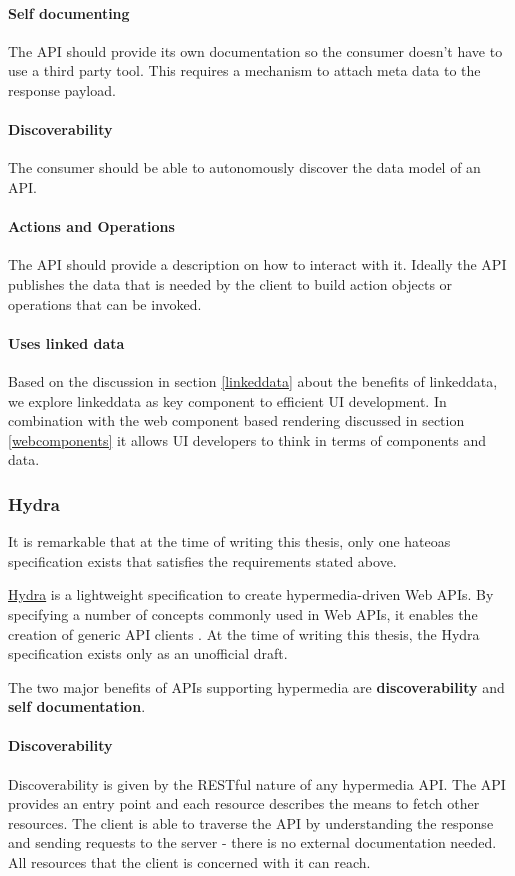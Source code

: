 \paragraph{Self documenting}
The API should provide its own documentation so the consumer doesn't have to use a third party tool. This requires a mechanism to attach meta data to the response payload.

\paragraph{Discoverability}
The consumer should be able to autonomously discover the data model of an API.

\paragraph{Actions and Operations}
The API should provide a description on how to interact with it. Ideally the API publishes the data that is needed by the client to build action objects or operations that can be invoked.

\paragraph{Uses linked data}
Based on the discussion in section \ref{linkeddata} about the benefits of \gls{linkeddata}, we explore \gls{linkeddata} as key component to efficient UI development. In combination with the web component based rendering discussed in section \ref{webcomponents} it allows UI developers to think in terms of components and data.

\subsubsection{Hydra}
It is remarkable that at the time of writing this thesis, only one \gls{hateoas} specification exists that satisfies the requirements stated above.

\href{http://www.hydra-cg.com/}{Hydra} is a lightweight specification to create hypermedia-driven Web APIs. By specifying a number of concepts commonly used in Web APIs, it enables the creation of generic API clients \citep{hydraspecs}. At the time of writing this thesis, the Hydra specification exists only as an unofficial draft.

The two major benefits of APIs supporting hypermedia are \textbf{discoverability} and \textbf{self documentation}.

\paragraph{Discoverability} Discoverability is given by the RESTful nature of any hypermedia API. The API provides an entry point and each resource describes the means to fetch other resources. The client is able to traverse the API by understanding the response and sending requests to the server - there is no external documentation needed. All resources that the client is concerned with it can reach.

